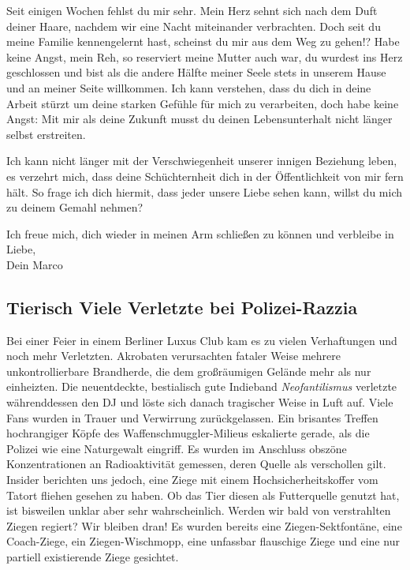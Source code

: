\documentclass[final]{multiversum}
\begin{document}
Seit einigen Wochen fehlst du mir sehr. Mein Herz sehnt sich nach dem Duft
deiner Haare, nachdem wir eine Nacht miteinander verbrachten. Doch seit du meine
Familie kennengelernt hast, scheinst du mir aus dem Weg zu gehen!?  Habe keine
Angst, mein Reh, so reserviert meine Mutter auch war, du wurdest ins Herz
geschlossen und bist als die andere Hälfte meiner Seele stets in unserem Hause
und an meiner Seite willkommen. Ich kann verstehen, dass du dich in deine
Arbeit stürzt um deine starken Gefühle für mich zu verarbeiten, doch habe
keine Angst: Mit mir als deine Zukunft musst du deinen Lebensunterhalt nicht
länger selbst erstreiten.

Ich kann nicht länger mit der Verschwiegenheit unserer innigen Beziehung leben,
es verzehrt mich, dass deine Schüchternheit dich in der Öffentlichkeit von mir
fern hält.  So frage ich dich hiermit, dass jeder unsere Liebe sehen kann,
willst du mich zu deinem Gemahl nehmen?

Ich freue mich, dich wieder in meinen Arm schließen zu können und verbleibe
in Liebe,\\
Dein Marco 

\subsection{Tierisch Viele Verletzte bei Polizei-Razzia}

Bei einer Feier in einem Berliner Luxus Club kam es zu vielen Verhaftungen und
noch mehr Verletzten. Akrobaten verursachten fataler Weise mehrere
unkontrollierbare Brandherde, die dem großräumigen Gelände mehr als nur
einheizten. Die neuentdeckte, bestialisch gute Indieband \emph{Neofantilismus}
verletzte währenddessen den DJ und löste sich danach tragischer Weise in Luft
auf. Viele Fans wurden in Trauer und Verwirrung zurückgelassen. Ein brisantes
Treffen hochrangiger Köpfe des Waffenschmuggler-Milieus eskalierte gerade, als
die Polizei wie eine Naturgewalt eingriff. Es wurden im Anschluss obszöne
Konzentrationen an Radioaktivität gemessen, deren Quelle als verschollen gilt.
Insider berichten uns jedoch, eine Ziege mit einem Hochsicherheitskoffer vom
Tatort fliehen gesehen zu haben. Ob das Tier diesen als Futterquelle genutzt
hat, ist bisweilen unklar aber sehr wahrscheinlich. Werden wir bald von
verstrahlten Ziegen regiert? Wir bleiben dran! Es wurden bereits eine
Ziegen-Sektfontäne, eine Coach-Ziege, ein Ziegen-Wischmopp, eine unfassbar
flauschige Ziege und eine nur partiell existierende Ziege gesichtet.
\end{document}
